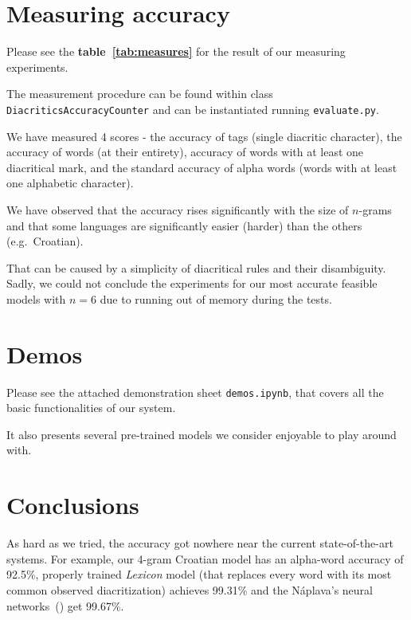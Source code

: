 \documentclass[12pt]{article}
\begin{document}
    \section{Measuring accuracy}\label{sec:measuring-accuracy}
    Please see the \textbf{table~\ref{tab:measures}} for the result of our measuring experiments.

    The measurement procedure can be found within class \texttt{DiacriticsAccuracyCounter} and can be instantiated running
    \texttt{evaluate.py}.

    \pagebreak
    \pagebreak
    We have measured 4 scores - the accuracy of tags (single diacritic character), the accuracy of words (at their entirety),
    accuracy of words with at least one diacritical mark, and the standard accuracy of alpha words (words with at least one alphabetic character).

    We have observed that the accuracy rises significantly with the size of $n$-grams and that some languages are significantly
    easier (harder) than the others (e.g.\ Croatian).

    That can be caused by a simplicity of diacritical rules and their disambiguity.
    Sadly, we could not conclude the experiments for our most accurate feasible models with $n=6$ due to
    running out of memory during the tests.



    \section{Demos}\label{sec:demos}
    Please see the attached demonstration sheet \texttt{demos.ipynb}, that covers all the basic
    functionalities of our system.

    It also presents several pre-trained models we consider enjoyable to play around with.


    \section{Conclusions}\label{sec:conclusions}
    As hard as we tried, the accuracy got nowhere near the current state-of-the-art systems.
    For example, our 4-gram Croatian model has an alpha-word accuracy of 92.5\%,
    properly trained \textit{Lexicon} model (that replaces every word with its most common observed diacritization)
    achieves 99.31\% and the N\'{a}plava's neural networks~(\cite{naplava}) get 99.67\%.
\end{document}
